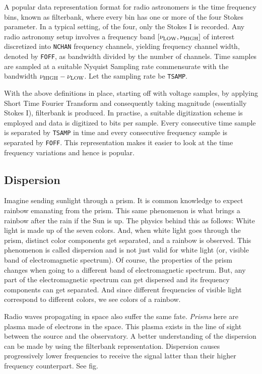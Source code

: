 \par A popular data representation format for radio astronomers is the time frequency bins, known as filterbank, where every bin has one or more of the four Stokes parameter. In a typical setting, of the four, only the Stokes I is recorded.
Any radio astronomy setup involves a frequency band $[\nu_{\rm LOW}, \nu_{\rm HIGH}]$ of interest discretized into \texttt{NCHAN} frequency channels, yielding frequency channel width, denoted by \texttt{FOFF}, as bandwidth divided by the number of channels.
Time samples are sampled at a suitable Nyquist Sampling rate commensurate with the bandwidth $\nu_{\rm HIGH} - \nu_{\rm LOW}$. Let the sampling rate be \texttt{TSAMP}.

\par With the above definitions in place, starting off with voltage samples, by applying Short Time Fourier Transform and consequently taking magnitude (essentially Stokes I), filterbank is produced. In practise, a suitable digitization scheme is employed and data is digitized to  bits per sample.
Every consecutive time sample is separated by \texttt{TSAMP} in time and every consecutive frequency sample is separated by \texttt{FOFF}.
This representation makes it easier to look at the time frequency variations and hence is popular.

\subsection{Dispersion}
\label{ssub:dis}

\par Imagine sending sunlight through a prism. It is common knowledge to expect rainbow emanating from the prism. 
This same phenomenon is what brings a rainbow after the rain if the Sun is up. The physics behind this as follows:
White light is made up of the seven colors. And, when white light goes through the prism, distinct color components get separated,
and a rainbow is observed. 
This phenomenon is called dispersion and is not just valid for white light (or, visible band of electromagnetic spectrum). 
Of course, the properties of the prism changes when going to a different band of electromagnetic spectrum. But, any part of the electromagnetic spectrum can get dispersed and its frequency components can get separated. And since different frequencies of visible light correspond to different colors, we see colors of a rainbow.

\par Radio waves propagating in space also suffer the same fate. \emph{Prisms} here are plasma made of electrons in the space. 
This plasma exists in the line of sight between the source and the observatory. A better understanding of the dispersion can be made by using the filterbank representation. Dispersion causes progressively lower frequencies to receive the signal latter than their higher frequency counterpart. See fig.

